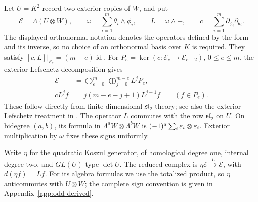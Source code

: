 Let $U=K^2$ record two exterior copies of $W$, and put
\[
 \mathcal E=\Lambda(U\otimes W),\qquad
 \omega=\sum_{i=1}^m\theta_i\wedge\phi_i,\qquad
 L=\omega\wedge-,\qquad
 c=\sum_{i=1}^m\partial_{\phi_i}\partial_{\theta_i}.
\]
The displayed orthonormal notation denotes the operators defined by
the form and its inverse, so no choice of an orthonormal basis over
$K$ is required. They satisfy
$[c,L]|_{\mathcal E_e}=(m-e)\operatorname{id}$. For
$P_e=\ker(c:\mathcal E_e\to\mathcal E_{e-2})$, $0\le e\le m$,
the exterior Lefschetz decomposition gives
\begin{align}
 \mathcal E&=\bigoplus_{e=0}^m\ \bigoplus_{j=0}^{m-e}L^jP_e,
 \label{eq:exterior-lefschetz-strings}\\
 cL^jf&=j(m-e-j+1)L^{j-1}f\qquad(f\in P_e).
 \label{eq:exterior-string-normalization}
\end{align}
These follow directly from finite-dimensional $\mathfrak{sl}_2$
theory; see also the exterior Lefschetz treatment in
\cite{KimRhoades}. The operator $L$ commutes with the row
$\mathfrak{sl}_2$ on $U$. On bidegree $(a,b)$, its formula in
$\Lambda^aW\otimes\Lambda^bW$ is
$(-1)^a\sum_i\varepsilon_i\otimes\varepsilon_i$. Exterior multiplication by
$\omega$ fixes these signs uniformly.

Write $\eta$ for the quadratic Koszul generator, of homological degree
one, internal degree two, and $GL(U)$ type $\det U$. The reduced
complex is $\eta\mathcal E\xrightarrow{\,L\,}\mathcal E$, with
$d(\eta f)=Lf$. For its algebra formulas we use the totalized
product, so $\eta$ anticommutes with $U\otimes W$; the complete
sign convention is given in Appendix~\ref{app:odd-derived}.

